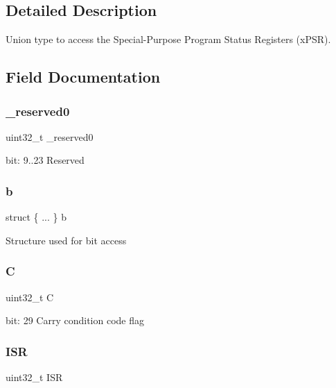 \subsection{Detailed Description}
Union type to access the Special-\/\+Purpose Program Status Registers (x\+P\+SR). 

\subsection{Field Documentation}
\mbox{\label{unionx_p_s_r___type_ac8a6a13838a897c8d0b8bc991bbaf7c1}} 
\subsubsection{\texorpdfstring{\_reserved0}{\_reserved0}}
{\footnotesize\ttfamily uint32\+\_\+t \+\_\+reserved0}

bit\+: 9..23 Reserved \mbox{\label{unionx_p_s_r___type_ab57daf12b15d905939ef81da6537919b}} 
\subsubsection{\texorpdfstring{b}{b}}
{\footnotesize\ttfamily struct \{ ... \}   b}

Structure used for bit access \mbox{\label{unionx_p_s_r___type_a7a1caf92f32fe9ebd8d1fe89b06c7776}} 
\subsubsection{\texorpdfstring{C}{C}}
{\footnotesize\ttfamily uint32\+\_\+t C}

bit\+: 29 Carry condition code flag \mbox{\label{unionx_p_s_r___type_ad502ba7dbb2aab5f87c782b28f02622d}} 
\subsubsection{\texorpdfstring{ISR}{ISR}}
{\footnotesize\ttfamily uint32\+\_\+t I\+SR}

